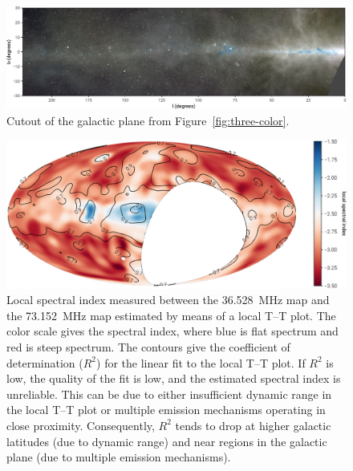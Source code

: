 \begin{bibunit}
\begin{figure}[t]
    \centering
    \includegraphics[width=\textwidth]{figures/chapter3/ovro-lwa-galactic-plane.pdf}
    \caption{
        Cutout of the galactic plane from Figure~\ref{fig:three-color}.
    }
    \label{fig:galactic-plane-cutout}
\end{figure}

\begin{figure}[t]
    \centering
    \includegraphics[width=\textwidth]{figures/chapter3/better-internal-spectral-index}
    \caption{
        Local spectral index measured between the 36.528~MHz map and the 73.152~MHz map estimated by
        means of a local T--T plot. The color scale gives the spectral index, where blue is flat
        spectrum and red is steep spectrum. The contours give the coefficient of determination
        ($R^2$) for the linear fit to the local T--T plot. If $R^2$ is low, the quality of the fit
        is low, and the estimated spectral index is unreliable. This can be due to either
        insufficient dynamic range in the local T--T plot or multiple emission mechanisms operating
        in close proximity. Consequently, $R^2$ tends to drop at higher galactic latitudes (due to
        dynamic range) and near  regions in the galactic plane (due to multiple emission
        mechanisms).
    }
    \label{fig:internal-spectral-index}
\end{figure}


\end{bibunit}
